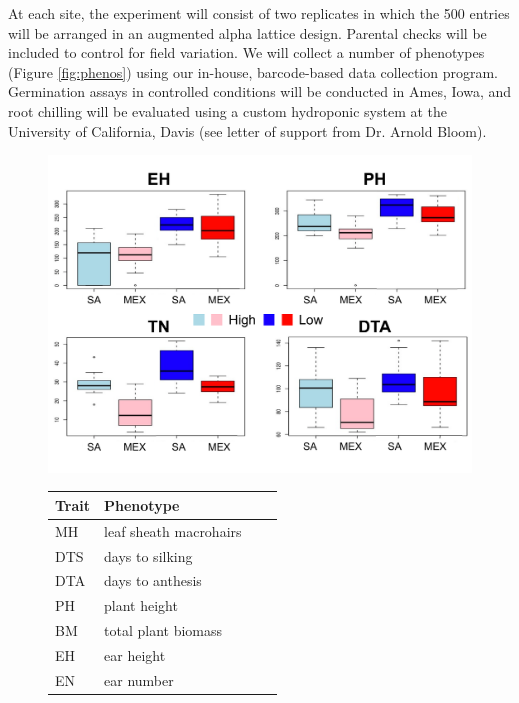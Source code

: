 At each site, the experiment will consist of two replicates in which the 500 entries  will be arranged in an augmented alpha lattice design.  Parental checks will be included to control for field variation.  We will collect a  number of phenotypes (Figure \ref{fig:phenos}) using our in-house, barcode-based data collection program. Germination assays  in controlled conditions will be conducted in Ames, Iowa, and root chilling will be evaluated using a custom hydroponic system at the University of California, Davis (see letter of support from Dr. Arnold Bloom).    

\begin{figure}[ht!]
	\begin{minipage}{0.5\textwidth}
    		\centering
   		\includegraphics[width=\textwidth]{fourtraits.pdf}
  	\end{minipage}%
  	\begin{minipage}[c]{0.50\textwidth}
  		\centering
		\begin{tabular}{llcc}\\\toprule  
		{\bf Trait} & {\bf Phenotype}  \\\midrule
		MH & leaf sheath macrohairs  \\
		DTS & days to silking  \\
		DTA & days to anthesis  \\
		PH & plant height 			\\
		BM & total plant biomass 	\\
		EH & ear height			 \\
		EN & ear number			 \\

\end{tabular}
\end{minipage}
\end{figure}
